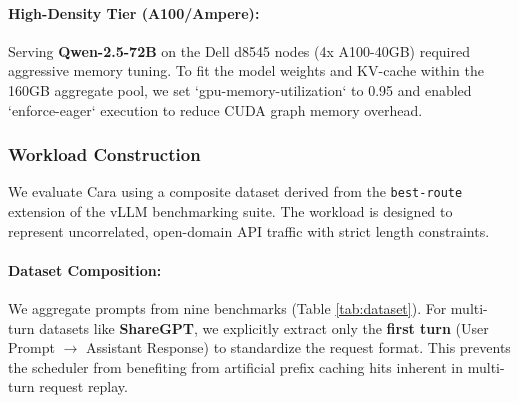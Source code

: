 \documentclass[letterpaper, anonymous, twocolumn, 10pt]{article}
\begin{document}
\paragraph{High-Density Tier (A100/Ampere):}
Serving \textbf{Qwen-2.5-72B} on the Dell d8545 nodes (4x A100-40GB) required aggressive memory tuning. To fit the model weights and KV-cache within the 160GB aggregate pool, we set `gpu-memory-utilization` to 0.95 and enabled `enforce-eager` execution to reduce CUDA graph memory overhead.

\begin{table}[h]
\centering
\small
{}
\caption{\textbf{Super-Heterogeneous Testbed.} The cluster serves the Qwen-2.5 family. Notably, Qwen-3B is served on both modern A30s and legacy P100s to test Cara's ability to model intra-model performance variance across hardware generations.}
\label{tab:testbed}
\end{table}

\subsubsection{Workload Construction}
We evaluate Cara using a composite dataset derived from the \texttt{best-route} extension of the vLLM benchmarking suite. The workload is designed to represent uncorrelated, open-domain API traffic with strict length constraints.

\paragraph{Dataset Composition:}
We aggregate prompts from nine benchmarks (Table \ref{tab:dataset}). For multi-turn datasets like \textbf{ShareGPT}, we explicitly extract only the \textbf{first turn} (User Prompt $\to$ Assistant Response) to standardize the request format. This prevents the scheduler from benefiting from artificial prefix caching hits inherent in multi-turn request replay.
\end{document}
